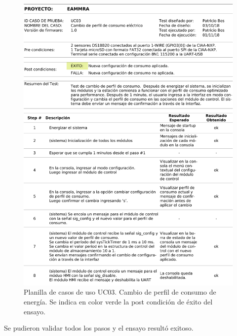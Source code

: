 \begin{figure}[!htb]
	\centering
	\includegraphics[width=1\textwidth]{./Figures/UseCase3_recortada.pdf}
	\caption{Planilla de casos de uso UC03.  Cambio de perfil de consumo de energía. Se indica en color verde la post condición de éxito del ensayo.}
	\label{fig:useCase3}
\end{figure}

Se pudieron validar todos los pasos y el ensayo resultó exitoso.

